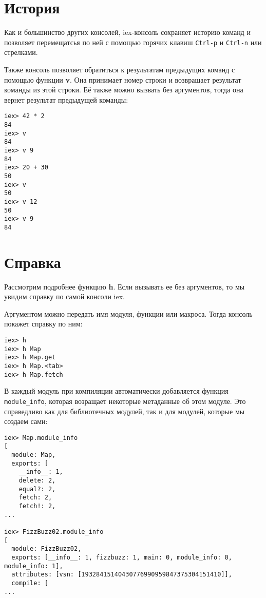\section{История}

Как и большинство других консолей, iex-консоль сохраняет историю команд и позволяет перемещатсья по ней с помощью горячих клавиш \texttt{Ctrl-p} и \texttt{Ctrl-n} или стрелками.

Также консоль позволяет обратиться к результатам предыдущих команд с помощью функции \textbf{v}. Она принимает номер строки и возвращает результат команды из этой строки. Её также можно вызвать без аргументов, тогда она вернет результат предыдущей команды:

\begin{lstlisting}[language=ElixirShell, style=elixir-shell]
iex> 42 * 2
84
iex> v
84
iex> v 9
84
iex> 20 + 30
50
iex> v
50
iex> v 12
50
iex> v 9
84
\end{lstlisting}

\section{Справка}

Рассмотрим подробнее функцию \textbf{h}. Если вызывать ее без аргументов, то мы увидим справку по самой консоли iex. 

Аргументом можно передать имя модуля, функции или макроса. Тогда консоль покажет справку по ним:
\begin{lstlisting}[language=ElixirShell, style=elixir-shell]
iex> h
iex> h Map
iex> h Map.get
iex> h Map.<tab>
iex> h Map.fetch
\end{lstlisting}

В каждый модуль при компиляции автоматически добавляется функция \texttt{module\_info}, которая возращает некоторые метаданные об этом модуле. Это справедливо как для библиотечных модулей, так и для модулей, которые мы создаем сами:

\begin{lstlisting}[language=ElixirShell, style=elixir-shell]
iex> Map.module_info
[
  module: Map,
  exports: [
    __info__: 1,
    delete: 2,
    equal?: 2,
    fetch: 2,
    fetch!: 2,
...

iex> FizzBuzz02.module_info
[
  module: FizzBuzz02,
  exports: [__info__: 1, fizzbuzz: 1, main: 0, module_info: 0, module_info: 1],
  attributes: [vsn: [19328415140430776990959847375304151410]],
  compile: [
...
\end{lstlisting}


